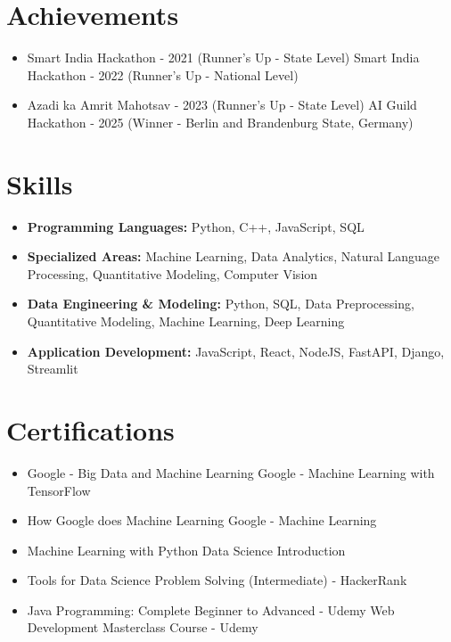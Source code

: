 \documentclass[a4paper,10pt]{article}
\begin{document}
\section*{Achievements}
\begin{itemize}
\item Smart India Hackathon - 2021 (Runner's Up - State Level) \hfill Smart India Hackathon - 2022 (Runner's Up - National Level)
\item Azadi ka Amrit Mahotsav - 2023 (Runner's Up - State Level) \hfill AI Guild Hackathon - 2025 (Winner - Berlin and Brandenburg State, Germany)
\end{itemize}

\section*{Skills}
\begin{itemize}
  \item \textbf{Programming Languages:} Python, C++, JavaScript, SQL
  \item \textbf{Specialized Areas:} Machine Learning, Data Analytics, Natural Language Processing, Quantitative Modeling, Computer Vision
  \item \textbf{Data Engineering \& Modeling:} Python, SQL, Data Preprocessing, Quantitative Modeling, Machine Learning, Deep Learning
  \item \textbf{Application Development:} JavaScript, React, NodeJS, FastAPI, Django, Streamlit
\end{itemize}

\section*{Certifications}
\begin{itemize}
\item Google - Big Data and Machine Learning \hfill Google - Machine Learning with TensorFlow
\item How Google does Machine Learning \hfill Google - Machine Learning
\item Machine Learning with Python \hfill Data Science Introduction
\item Tools for Data Science \hfill Problem Solving (Intermediate) - HackerRank
\item Java Programming: Complete Beginner to Advanced - Udemy \hfill Web Development Masterclass Course - Udemy
\end{itemize}
\end{document}
